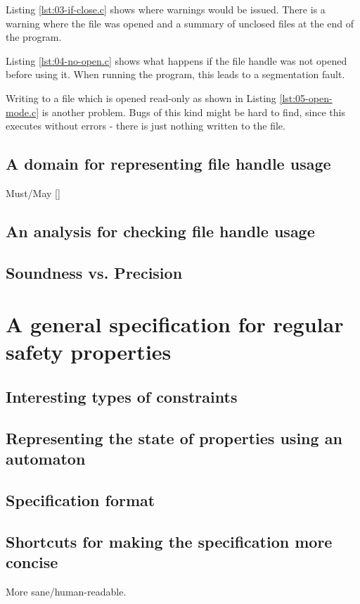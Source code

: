 Listing \ref{lst:03-if-close.c} shows where warnings would be issued. There is a warning where the file was opened and a summary of unclosed files at the end of the program.

Listing \ref{lst:04-no-open.c} shows what happens if the file handle was not opened before using it. When running the program, this leads to a segmentation fault.

Writing to a file which is opened read-only as shown in Listing \ref{lst:05-open-mode.c} is another problem. Bugs of this kind might be hard to find, since this executes without errors - there is just nothing written to the file.



\section{A domain for representing file handle usage}
Must/May []

\section{An analysis for checking file handle usage}

\section{Soundness vs. Precision}


\chapter{A general specification for regular safety properties}
\section{Interesting types of constraints}

\section{Representing the state of properties using an automaton}

\section{Specification format}

\section{Shortcuts for making the specification more concise}
More sane/human-readable.


